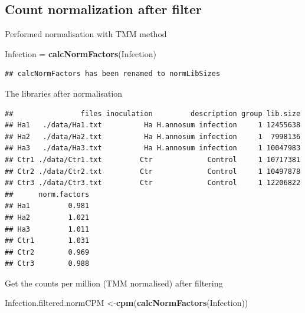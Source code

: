 \documentclass[
]{article}
\newenvironment{Shaded}{\begin{snugshade}}{\end{snugshade}}
\newcommand{\FunctionTok}[1]{\textcolor[rgb]{0.13,0.29,0.53}{\textbf{#1}}}
\newcommand{\NormalTok}[1]{#1}
\newcommand{\OtherTok}[1]{\textcolor[rgb]{0.56,0.35,0.01}{#1}}
\newcommand{\SpecialCharTok}[1]{\textcolor[rgb]{0.81,0.36,0.00}{\textbf{#1}}}
\begin{document}
\subsection{Count normalization after
filter}\label{count-normalization-after-filter}

Performed normalisation with TMM method

\begin{Shaded}
\begin{Highlighting}[]
\NormalTok{Infection }\OtherTok{=} \FunctionTok{calcNormFactors}\NormalTok{(Infection)}
\end{Highlighting}
\end{Shaded}

\begin{verbatim}
## calcNormFactors has been renamed to normLibSizes
\end{verbatim}

The libraries after normalisation

\begin{Shaded}
\end{Shaded}

\begin{verbatim}
##                files inoculation         description group lib.size
## Ha1   ./data/Ha1.txt          Ha H.annosum infection     1 12455638
## Ha2   ./data/Ha2.txt          Ha H.annosum infection     1  7998136
## Ha3   ./data/Ha3.txt          Ha H.annosum infection     1 10047983
## Ctr1 ./data/Ctr1.txt         Ctr             Control     1 10717381
## Ctr2 ./data/Ctr2.txt         Ctr             Control     1 10497878
## Ctr3 ./data/Ctr3.txt         Ctr             Control     1 12206822
##      norm.factors
## Ha1         0.981
## Ha2         1.021
## Ha3         1.011
## Ctr1        1.031
## Ctr2        0.969
## Ctr3        0.988
\end{verbatim}

Get the counts per million (TMM normalised) after filtering

\begin{Shaded}
\begin{Highlighting}[]
\NormalTok{Infection.filtered.normCPM }\OtherTok{\textless{}{-}}\FunctionTok{cpm}\NormalTok{(}\FunctionTok{calcNormFactors}\NormalTok{(Infection))}
\end{Highlighting}
\end{Shaded}
\end{document}
